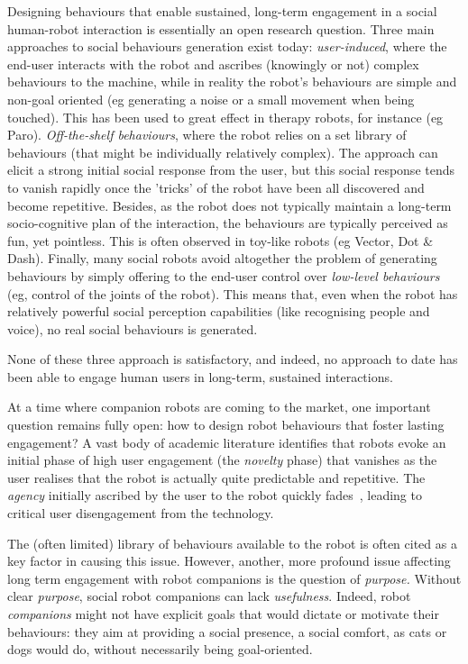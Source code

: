 \documentclass[11pt,a4paper]{report}
\begin{document}
Designing behaviours that
enable sustained, long-term engagement in a social human-robot interaction is
essentially an open research question. Three main approaches to social
behaviours generation exist today: \emph{user-induced}, where the end-user
interacts with the robot and ascribes (knowingly or not) complex behaviours to
the machine, while in reality the robot's behaviours are simple and non-goal
oriented (eg generating a noise or a small movement when being touched). This
has been used to great effect in therapy robots, for instance (eg Paro).
\emph{Off-the-shelf behaviours}, where the robot relies on a set library of
behaviours (that might be individually relatively complex). The approach can
elicit a strong initial social response from the user, but this social response
tends to vanish rapidly once the 'tricks' of the robot have been all discovered
and become repetitive.  Besides, as the robot does not typically maintain a
long-term socio-cognitive plan of the interaction, the behaviours are typically
perceived as fun, yet pointless. This is often observed in toy-like robots (eg
Vector, Dot \& Dash). Finally, many social robots avoid altogether the problem
of generating behaviours by simply offering to the end-user control over
\emph{low-level behaviours} (eg, control of the joints of the robot). This means
that, even when the robot has relatively powerful social perception capabilities
(like recognising people and voice), no real social behaviours is generated.

None of these three approach is satisfactory, and indeed, no approach to date
has been able to engage human users in long-term, sustained interactions.




At a time where companion robots are coming to the market, one important
question remains fully open: how to design robot behaviours that foster
lasting engagement? A vast body of academic literature identifies that
robots evoke an initial phase of high user engagement (the
\emph{novelty} phase) that vanishes as the user realises that the robot
is actually quite predictable and repetitive. The \emph{agency}
initially ascribed by the user to the robot quickly
fades~\cite{lemaignan2014dynamics}, leading to critical user disengagement from the technology.


The (often limited) library of behaviours available to the robot is
often cited as a key factor in causing this issue. However, another,
more profound issue affecting long term engagement with robot companions
is the question of \emph{purpose.} Without clear \emph{purpose}, social
robot companions can lack \emph{usefulness}. Indeed, robot
\emph{companions} might not have explicit goals that would dictate or
motivate their behaviours: they aim at providing a social presence, a
social comfort, as cats or dogs would do, without necessarily being
goal-oriented.
\end{document}

